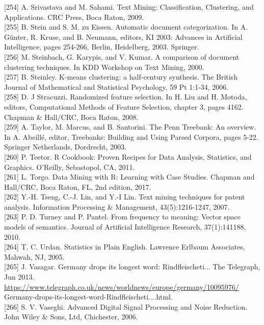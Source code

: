 \documentclass[10pt]{book}
\begin{document}
[254] A. Srivastava and M. Sahami. Text Mining: Classification, Clustering, and Applications. CRC Press, Boca Raton, 2009.\\[0pt]
[255] B. Stein and S. M. zu Eissen. Automatic document categorization. In A. Günter, R. Kruse, and B. Neumann, editors, KI 2003: Advances in Artificial Intelligence, pages 254-266, Berlin, Heidelberg, 2003. Springer.\\[0pt]
[256] M. Steinbach, G. Karypis, and V. Kumar. A comparison of document clustering techniques. In KDD Workshop on Text Mining, 2000.\\[0pt]
[257] B. Steinley. K-means clustering: a half-century synthesis. The British Journal of Mathematical and Statistical Psychology, 59 Pt 1:1-34, 2006.\\[0pt]
[258] D. J Stracuzzi. Randomized feature selection. In H. Liu and H. Motoda, editors, Computational Methods of Feature Selection, chapter 3, pages 4162. Chapman \& Hall/CRC, Boca Raton, 2008.\\[0pt]
[259] A. Taylor, M. Marcus, and B. Santorini. The Penn Treebank: An overview. In A. Abeillé, editor, Treebanks: Building and Using Parsed Corpora, pages 5-22. Springer Netherlands, Dordrecht, 2003.\\[0pt]
[260] P. Teetor. R Cookbook: Proven Recipes for Data Analysis, Statistics, and Graphics. O'Reilly, Sebastopol, CA, 2011.\\[0pt]
[261] L. Torgo. Data Mining with R: Learning with Case Studies. Chapman and Hall/CRC, Boca Raton, FL, 2nd edition, 2017.\\[0pt]
[262] Y.-H. Tseng, C.-J. Lin, and Y.-I Lin. Text mining techniques for patent analysis. Information Processing \& Management, 43(5):1216-1247, 2007.\\[0pt]
[263] P. D. Turney and P. Pantel. From frequency to meaning: Vector space models of semantics. Journal of Artificial Intelligence Research, 37(1):141188, 2010.\\[0pt]
[264] T. C. Urdan. Statistics in Plain English. Lawrence Erlbaum Associates, Mahwah, NJ, 2005.\\[0pt]
[265] J. Vasagar. Germany drops its longest word: Rindfleischeti... The Telegraph, Jun 2013. \href{https://www.telegraph.co.uk/news/worldnews/europe/germany/10095976/}{https://www.telegraph.co.uk/news/worldnews/europe/germany/10095976/} Germany-drops-its-longest-word-Rindfleischeti....html.\\[0pt]
[266] S. V. Vaseghi. Advanced Digital Signal Processing and Noise Reduction. John Wiley \& Sons, Ltd, Chichester, 2006.\\[0pt]
\end{document}
